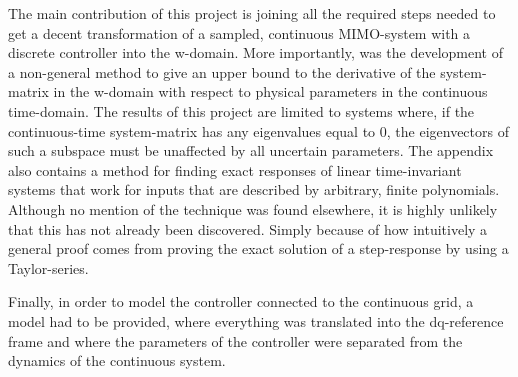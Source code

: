 The main contribution of this project is joining all the required steps needed to get a decent transformation of a sampled, continuous \gls{MIMO}-system with a discrete controller into the w-domain. More importantly, was the development of a non-general method to give an upper bound to the derivative of the system-matrix in the w-domain with respect to physical parameters in the continuous time-domain. The results of this project are limited to systems where, if the continuous-time system-matrix has any eigenvalues equal to 0, the eigenvectors of such a subspace must be unaffected by all uncertain parameters. 
\noindent 
The appendix also contains a method for finding exact responses of linear time-invariant systems that work for inputs that are described by arbitrary, finite polynomials. Although no mention of the technique was found elsewhere, it is highly unlikely that this has not already been discovered. Simply because of how intuitively a general proof comes from proving the exact solution of a step-response by using a Taylor-series.

Finally, in order to model the controller connected to the continuous grid, a model had to be provided, where everything was translated into the dq-reference frame and where the parameters of the controller were separated from the dynamics of the continuous system. 
\noindent
{}



